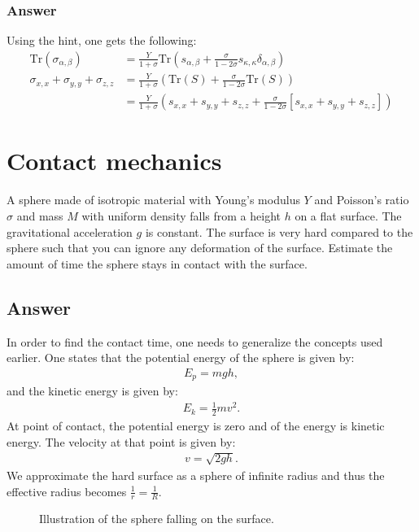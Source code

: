 \documentclass{article}
\newcommand{\trace}{\text{Tr}}
\begin{document}
\subsubsection*{Answer}
Using the hint, one gets the following:
\begin{align*}
    \trace\left(\sigma_{\alpha, \beta}\right) &= \frac{Y}{1+\sigma}\trace\left(s_{\alpha,\beta} + \frac{\sigma}{1-2\sigma}s_{\kappa, \kappa}\delta_{\alpha,\beta}\right)\\
    \sigma_{x,x} + \sigma_{y,y} + \sigma_{z,z} &= \frac{Y}{1+\sigma}\left(\trace(S) + \frac{\sigma}{1-2\sigma}\trace(S)\right)\\
    &=\frac{Y}{1+\sigma}\left(s_{x,x} + s_{y,y} + s_{z,z} + \frac{\sigma}{1-2\sigma}\left[s_{x,x} + s_{y,y} + s_{z,z}\right]\right)
\end{align*}




\section*{Contact mechanics}
A sphere made of isotropic material with Young's modulus $Y$ and Poisson's ratio $\sigma$ and mass $M$ with uniform density falls from a height $h$ on a flat surface.
The gravitational acceleration $g$ is constant. The surface is very hard compared to the sphere such that you can ignore any deformation of the surface. Estimate the amount of time the sphere stays in contact with the surface.

\subsection*{Answer}
In order to find the contact time, one needs to generalize the concepts used earlier. One states that the potential energy of the sphere is given by:
\begin{align*}
    E_p = mgh,
\end{align*}and the kinetic energy is given by:
\begin{align*}
    E_k = \frac{1}{2}mv^2.
\end{align*}At point of contact, the potential energy is zero and of the energy is kinetic energy. The velocity at that point is given by:
\begin{align*}
    v = \sqrt{2gh}.
\end{align*}We approximate the hard surface as a sphere of infinite radius and thus the effective radius becomes $\frac{1}{r} = \frac{1}{R}$.
\begin{figure}[H]
    \centering
    \caption{Illustration of the sphere falling on the surface.}
    \label{fig: task4}
\end{figure}
\end{document}
